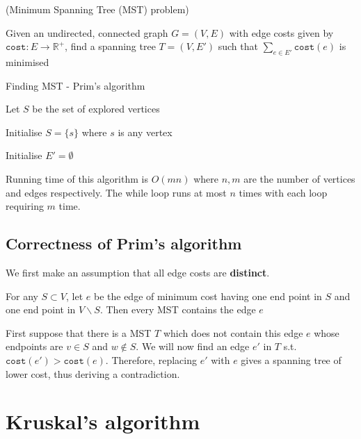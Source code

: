 \documentclass{article}
\begin{document}
\begin{problem}(Minimum Spanning Tree (MST) problem)

Given an undirected, connected graph $G = (V,E)$ with edge costs given by $\texttt{cost}: E \rightarrow \mathbb{R}^{+} $, find a spanning tree $T = (V,E')$ such that $\sum_{e\in E'}\texttt{cost}(e)$ is minimised
\end{problem}

\begin{algorithm}
  \caption{Finding MST - Prim's algorithm}

  Let $S$ be the set of explored vertices

  Initialise $S = \{ s \} $ where $s$ is any vertex

  Initialise $E' = \emptyset$


\end{algorithm}

Running time of this algorithm is $O(mn)$ where $n,m$ are the number of vertices and edges respectively.
The while loop runs at most $n$ times with each loop requiring $m$ time.

\subsection{Correctness of Prim's algorithm}

We first make an assumption that all edge costs are \textbf{distinct}.

\begin{theorem}
  For any $S \subset V$, let $e$ be the edge of minimum cost having one end point in $S$ and one end point in $V \backslash S$. Then every MST contains the edge $e$
\end{theorem}

First suppose that there is a MST $T$ which does not contain this edge $e$ whose endpoints are $v\in S$ and $w \notin S$. We will now find an edge $e'$ in $T$ s.t. $\texttt{cost} (e') >\texttt{cost} (e)$. Therefore, replacing $e'$ with $e$ gives a spanning tree of lower cost, thus deriving a contradiction.

\section{Kruskal's algorithm}
\end{document}
